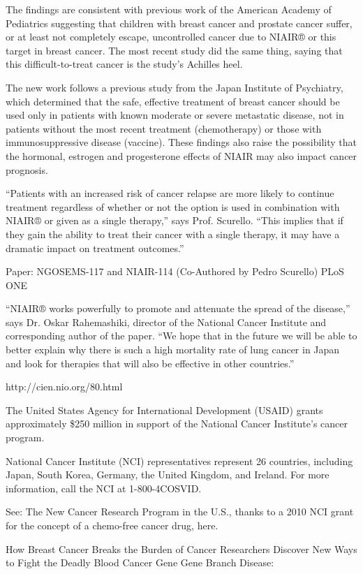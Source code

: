 \documentclass{article}
\begin{document}
The findings are consistent with previous work of the American Academy of Pediatrics suggesting that children with breast cancer and prostate cancer suffer, or at least not completely escape, uncontrolled cancer due to NIAIR® or this target in breast cancer. The most recent study did the same thing, saying that this difficult-to-treat cancer is the study’s Achilles heel.

The new work follows a previous study from the Japan Institute of Psychiatry, which determined that the safe, effective treatment of breast cancer should be used only in patients with known moderate or severe metastatic disease, not in patients without the most recent treatment (chemotherapy) or those with immunosuppressive disease (vaccine). These findings also raise the possibility that the hormonal, estrogen and progesterone effects of NIAIR may also impact cancer prognosis.

“Patients with an increased risk of cancer relapse are more likely to continue treatment regardless of whether or not the option is used in combination with NIAIR® or given as a single therapy,” says Prof. Scurello. “This implies that if they gain the ability to treat their cancer with a single therapy, it may have a dramatic impact on treatment outcomes.”

Paper: NGOSEMS-117 and NIAIR-114 (Co-Authored by Pedro Scurello) PLoS ONE

“NIAIR® works powerfully to promote and attenuate the spread of the disease,” says Dr. Oskar Rahemashiki, director of the National Cancer Institute and corresponding author of the paper. “We hope that in the future we will be able to better explain why there is such a high mortality rate of lung cancer in Japan and look for therapies that will also be effective in other countries.”

http://cien.nio.org/80.html

The United States Agency for International Development (USAID) grants approximately \$250 million in support of the National Cancer Institute’s cancer program.

National Cancer Institute (NCI) representatives represent 26 countries, including Japan, South Korea, Germany, the United Kingdom, and Ireland. For more information, call the NCI at 1-800-4COSVID.

See: The New Cancer Research Program in the U.S., thanks to a 2010 NCI grant for the concept of a chemo-free cancer drug, here.

How Breast Cancer Breaks the Burden of Cancer Researchers Discover New Ways to Fight the Deadly Blood Cancer Gene Gene Branch Disease:
\end{document}

